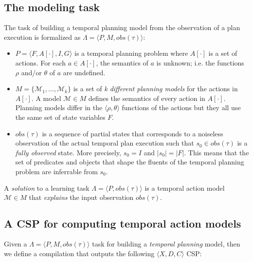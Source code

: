 \documentclass[letterpaper]{article} %
\newcommand{\tup}[1]{{\langle #1 \rangle}}
\begin{document}
\subsection{The modeling task}
The task of building a temporal planning model from the observation of a plan execution is formalized as $\Lambda=\tup{P,M,obs(\tau)}$:
\begin{itemize}
\item $P=\tup{F,A[\cdot],I,G}$ is a temporal planning problem where $A[\cdot]$ is a set of actions. For each $a\in A[\cdot]$, the semantics of $a$ is unknown; i.e. the functions $\rho$ and/or $\theta$ of $a$ are undefined.
\item $M=\{\mathcal{M}_1,\ldots,\mathcal{M}_k\}$ is a set of {\em k different planning models} for the actions in $A[\cdot]$. A model $\mathcal{M}\in M$ defines the semantics of every action in $A[\cdot]$. Planning models differ in the $\tup{\rho,\theta}$ functions of the actions but they all use the same set of state variables $F$.
\item $obs(\tau)$ is a sequence of partial states that corresponds to a noiseless observation of the actual temporal plan execution such that $s_0\in obs(\tau)$ is a {\em fully observed} state. More precisely, $s_0=I$ and $|s_0|=|F|$. This means that the set of predicates and objects that shape the fluents of the temporal planning problem are inferrable from $s_0$.
\end{itemize}

A {\em solution} to a learning task $\Lambda=\tup{P,obs(\tau)}$ is a temporal action model $\mathcal{M}\in M$ that {\em explains} the input observation $obs(\tau)$.

\subsection{A CSP for computing temporal action models}
Given a $\Lambda=\tup{P,M,obs(\tau)}$ task for building a {\em temporal planning} model, then we define a compilation that outputs the following $\tup{X,D,C}$ CSP:
\end{document}
